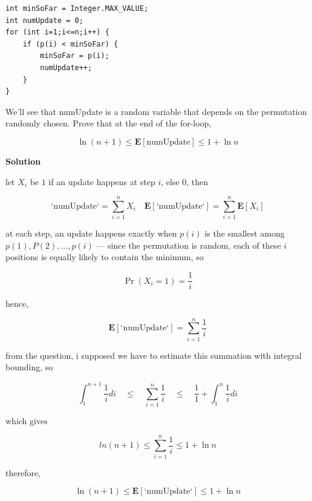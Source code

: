 \documentclass{article}
\newcommand{\solution}{\textbf{\large Solution}}
\theoremstyle{remark}
\begin{document}
\begin{verbatim}
int minSoFar = Integer.MAX_VALUE;
int numUpdate = 0;
for (int i=1;i<=n;i++) {
    if (p(i) < minSoFar) {
        minSoFar = p(i);
        numUpdate++;
    }
}
\end{verbatim}

We’ll see that numUpdate is a random variable that depends on the permutation randomly chosen.
Prove that at the end of the for-loop,

\[\ln(n +1) \le \mathbf{E}[\text{numUpdate}] \le 1+\ln n\]

\medskip
\solution

let $X_i$ be $1$ if an update happens at step $i$, else 0, then

\[
\text{`numUpdate`} = \sum_{i=1}^n X_i
\quad
\mathbf{E}[\text{`numUpdate`}] = \sum_{i=1}^n \mathbf{E}[X_i]
\]

at each step, an update happens exactly when $p(i)$ is the smallest among $p(1), P(2), ..., p(i)$ --- since the permutation is random, each of these $i$ positions
is equally likely to contain the minimum, so

\[
\Pr(X_i=1) = \frac{1}{i}
\]

hence, 

\[
\mathbf{E}[\text{`numUpdate`}] = \sum_{i=1}^n \frac{1}{i}
\]

from the question, i supposed we have to estimate this summation with integral bounding, so

\[
    \int_{1}^{n+1} \frac{1}{i} di \quad \le \quad \sum_{i=1}^{n} \frac{1}{i} \quad \le \quad \frac{1}{1} + \int_1^n \frac{1}{i} di
\]

which gives

\[
    ln(n+1) \le \sum_{i=1}^n \frac{1}{i} \le 1 + \ln n
\]

therefore,

\[
\boxed{\ln(n+1) \le \mathbf{E}[\text{`numUpdate`}] \le 1 + \ln n}
\]

\vspace{1em}
\hrulefill


\end{document}
